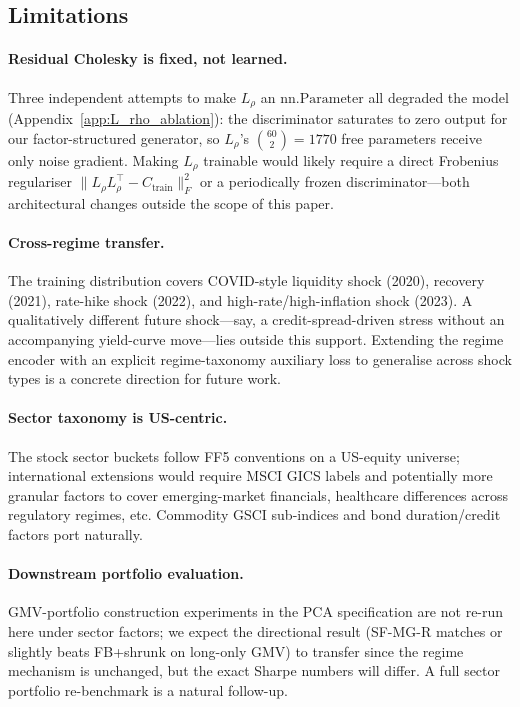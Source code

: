 \subsection{Limitations}
\label{sec:limitations}

\paragraph{Residual Cholesky is fixed, not learned.}
Three independent attempts to make $L_\rho$ an $\mathrm{nn.Parameter}$ all degraded the model (Appendix~\ref{app:L_rho_ablation}): the discriminator saturates to zero output for our factor-structured generator, so $L_\rho$'s $\binom{60}{2} = 1770$ free parameters receive only noise gradient. Making $L_\rho$ trainable would likely require a direct Frobenius regulariser $\|L_\rho L_\rho^\top - C_{\text{train}}\|_F^2$ or a periodically frozen discriminator---both architectural changes outside the scope of this paper.

\paragraph{Cross-regime transfer.}
The training distribution covers COVID-style liquidity shock (2020), recovery (2021), rate-hike shock (2022), and high-rate/high-inflation shock (2023). A qualitatively different future shock---say, a credit-spread-driven stress without an accompanying yield-curve move---lies outside this support. Extending the regime encoder with an explicit regime-taxonomy auxiliary loss to generalise across shock types is a concrete direction for future work.

\paragraph{Sector taxonomy is US-centric.}
The stock sector buckets follow FF5 conventions on a US-equity universe; international extensions would require MSCI GICS labels and potentially more granular factors to cover emerging-market financials, healthcare differences across regulatory regimes, etc. Commodity GSCI sub-indices and bond duration/credit factors port naturally.

\paragraph{Downstream portfolio evaluation.}
GMV-portfolio construction experiments in the PCA specification are not re-run here under sector factors; we expect the directional result (SF-MG-R matches or slightly beats FB+shrunk on long-only GMV) to transfer since the regime mechanism is unchanged, but the exact Sharpe numbers will differ. A full sector portfolio re-benchmark is a natural follow-up.
